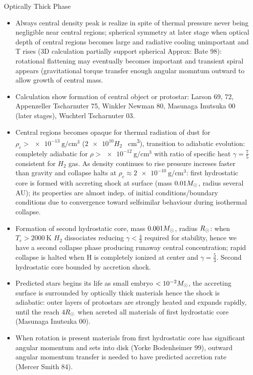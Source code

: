 \frameinlbftrue
\begin{frame}{Optically Thick Phase}
    \begin{itemize}
        \item Always central density peak is realize in spite of thermal pressure never being negligible near central regions; spherical symmetry at later stage when optical depth of central regions becomes large and radiative cooling unimportant and T rises (3D calculation partially support spherical Approx: Bate 98): rotational flattening may eventually becomes important and transient spiral appears (gravitational torque transfer enough angular momntum outward to allow growth of central mass.
            \item Calculation show formation of central object or protostar: Larson 69, 72, Appenzeller Tscharnuter 75, Winkler Newman 80, Masunaga Inutsuka 00 (later stages), Wuchterl Tscharnuter 03.
            \item Central regions becomes opaque for thermal radiation of dust for $\rho_c>\SI{e-13}{\gram\per\cubic\cm}$ ($\num{2e10} H_2$ \si{\per\cubic\cm}), transition to adiabatic evolution: completely adiabatic for $\rho>\SI{e-12}{\gram\per\cubic\cm}$ with ratio of specific heat $\gamma=\frac{7}{5}$ consistent for $H_2$ gas. As density continues to rise pressure increses faster than gravity and collapse halts at $\rho_c\approx\SI{2e-10}{\gram\per\cubic\cm}$: first hydrostatic core is formed with accreting shock at surface (mass $0.01 M_{\odot}{}$, radius several AU); its properties are almost indep. of initial conditions/boundary conditions due to convergence toward selfsimilar behaviour during isothermal collapse.
            \item Formation of second hydrostatic core, mass $0.001M_{\odot}{}$, radius $R_{\odot}{}$: when $T_c>\SI{2000}{\kelvin}$ $H_2$ dissociates reducing $\gamma<\frac{4}{3}$ required for stability, hence we have a second collapse phase producing runaway central concentration; rapid collapse is halted when H is completely ionized at center and $\gamma=\frac{5}{3}$. Second hydrostatic core bounded by accretion shock.
            \item Predicted stars begins its life as small embryo $<\num{e-2}M_{\odot}{}$, the accreting surface is surrounded by optically thick materials hence the shock is adiabatic: outer layers of protostars are strongly heated and expands rapidly, until the reach $4R_{\odot}{}$ when acreted all materials of first hydrostatic core (Masunaga Inutsuka 00).
            \item When rotation is present materials from first hydrostatic core has significant angular momentum and sets into disk (Yorke Bodenheimer 99), outward angular momentum transfer is needed to have predicted accretion rate (Mercer Smith 84).
    \end{itemize}
\end{frame}
\frameinlbffalse

